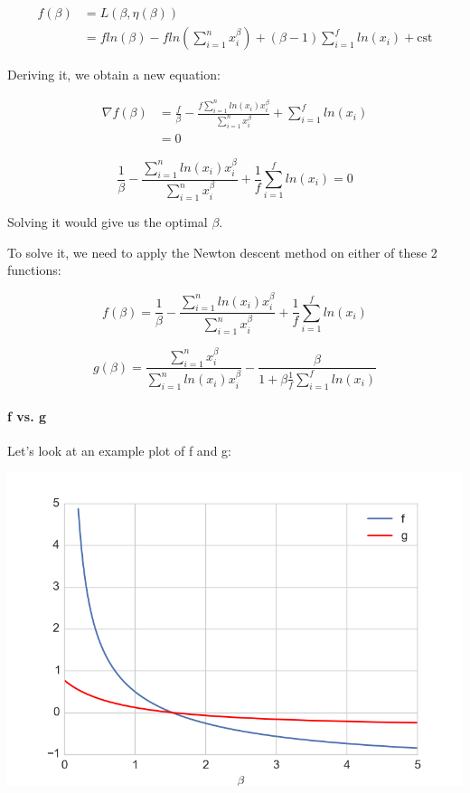 \documentclass[a4paper,11pt]{article}
\begin{document}
\begin{align*}
f(\beta) & = L(\beta, \eta(\beta)) \\ \
		 & = fln(\beta)- fln\left( \sum\limits_{i=1}^n x_i^{\beta} \right) + (\beta - 1)\sum_{i=1}^f ln(x_i) + \text{cst}
\end{align*}

Deriving it, we obtain a new equation:

\begin{align*}
\nabla f(\beta) & = \frac{f}{\beta}  - \frac{f \sum\limits_{i=1}^n ln(x_i) x_i^{\beta} }{\sum\limits_{i=1}^n x_i^{\beta}} + \sum_{i=1}^f ln(x_i) \\ \
				& = 0
\end{align*}

$$
\frac{1}{\beta}  - \frac{\sum\limits_{i=1}^n ln(x_i) x_i^{\beta} }{\sum\limits_{i=1}^n x_i^{\beta}} + \frac{1}{f}\sum_{i=1}^f ln(x_i) = 0
$$

Solving it would give us the optimal $\beta$. 

To solve it, we need to apply the Newton descent method on either of these 2 functions: 

$$
f(\beta) = \frac{1}{\beta}  - \frac{\sum\limits_{i=1}^n ln(x_i) x_i^{\beta} }{\sum\limits_{i=1}^n x_i^{\beta}} + \frac{1}{f}\sum_{i=1}^f ln(x_i) 
$$

$$
g(\beta) =   \frac{\sum\limits_{i=1}^n x_i^{\beta}}{\sum\limits_{i=1}^n ln(x_i) x_i^{\beta}} - \frac{\beta}{1+\beta\frac{1}{f}\sum_{i=1}^f ln(x_i)} 
$$

\paragraph{f vs. g}

Let's look at an example plot of f and g:

\includegraphics[scale=0.5]{newton_plot2.png}
\end{document}
